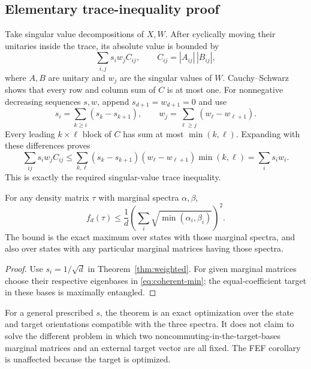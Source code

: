 \subsection{Elementary trace-inequality proof}
Take singular value decompositions of $X,W$. After cyclically moving their unitaries inside the trace, its absolute value is bounded by
\[
 \sum_{i,j}s_i w_j C_{ij},\qquad C_{ij}=|A_{ij}|\,|B_{ij}|,
\]
where $A,B$ are unitary and $w_j$ are the singular values of $W$. Cauchy--Schwarz shows that every row and column sum of $C$ is at most one. For nonnegative decreasing sequences $s,w$, append $s_{d+1}=w_{d+1}=0$ and use
\[
 s_i=\sum_{k\ge i}(s_k-s_{k+1}),\qquad
 w_j=\sum_{\ell\ge j}(w_\ell-w_{\ell+1}).
\]
Every leading $k\times\ell$ block of $C$ has sum at most $\min(k,\ell)$. Expanding with these differences proves
\[
 \sum_{ij}s_iw_jC_{ij}\le
 \sum_{k,\ell}(s_k-s_{k+1})(w_\ell-w_{\ell+1})\min(k,\ell)
 =\sum_i s_iw_i.
\]
This is exactly the required singular-value trace inequality.

\begin{corollary}\label{cor:marginal-fef}
For any density matrix $\tau$ with marginal spectra $\alpha,\beta$,
\begin{equation}\label{eq:two-marginal-fef}
 f_d(\tau)\le\frac1d\left(\sum_i\sqrt{\min(\alpha_i,\beta_i)}\right)^2.
\end{equation}
The bound is the exact maximum over states with those marginal spectra, and also over states with any particular marginal matrices having those spectra.
\end{corollary}
\begin{proof}
Use $s_i=1/\sqrt d$ in Theorem~\ref{thm:weighted}. For given marginal matrices choose their respective eigenbases in \eqref{eq:coherent-min}; the equal-coefficient target in these bases is maximally entangled.\end{proof}

\begin{remark}
For a general prescribed $s$, the theorem is an exact optimization over the state and target orientations compatible with the three spectra. It does not claim to solve the different problem in which two noncommuting-in-the-target-bases marginal matrices and an external target vector are all fixed. The FEF corollary is unaffected because the target is optimized.
\end{remark}

